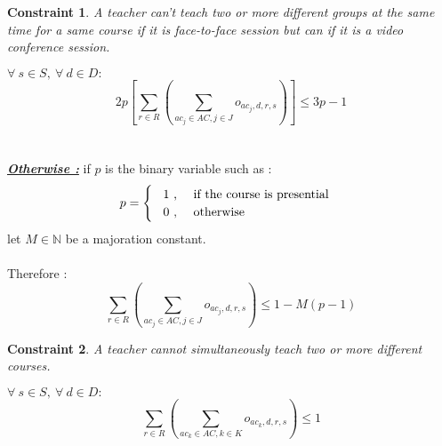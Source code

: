 \documentclass[12pt,a4paper]{article}
\newtheorem{theorem}{Constraint}
\begin{document}
\begin{theorem}
A teacher can't teach two or more different groups at the same time for a same course if it is face-to-face session but can if it is a video conference session.
\end{theorem}
$
\forall \ s \in S,\ \forall \ d \in D :
$
\begin{equation}
2p \left[ \sum_{r\in R}\left(\sum_{ac_{j} \in AC, j \in J}{o_{ac_{j}, d, r, s}}\right)\right] \leq 3p - 1
\end{equation}
\\ \\
\textbf{\textit{\underline{Otherwise :}}}
if $p$ is the binary variable such as :
\[
	p = 
	\begin{cases}
		\hspace{0.3cm} 1 \text{ , \quad if the course is presential} \\
		\hspace{0.3cm}0 \text{ , \quad otherwise}
	\end{cases} 
\]	
let $M \in \mathbb{N}$ be a majoration constant. \\ \\
Therefore :
\begin{equation}
\sum_{r\in R}\left(\sum_{ac_{j} \in AC, j \in J}{o_{ac_{j}, d, r, s}}\right) \leq 1 - M(p - 1)
\end{equation}

\begin{theorem}
A teacher cannot simultaneously teach two or more different courses.
\end{theorem}
$
\forall \ s \in S,\ \forall \ d \in D : 
$
\begin{equation}
\sum_{r\in R}\left(\sum_{ac_k \in AC, k \in K}{o_{ac_{k}, d, r, s}}\right) \leq 1
\end{equation}
\end{document}
